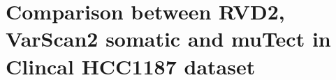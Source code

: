 \documentclass[11pt,reqno]{amsart}
\begin{document}
\section{Comparison between RVD2, VarScan2 somatic and muTect in Clincal HCC1187 dataset}




\end{document}
